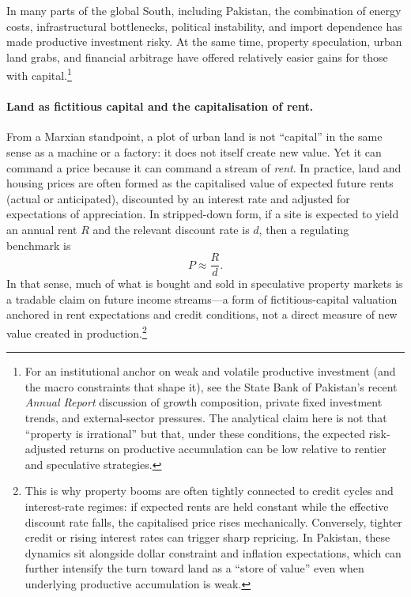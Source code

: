 In many parts of the global South, including Pakistan, the combination of
energy costs, infrastructural bottlenecks, political instability, and import
dependence has made productive investment risky. At the same time, property
speculation, urban land grabs, and financial arbitrage have offered
relatively easier gains for those with capital.\cite{StrugglePK_TDR}\footnote{For an institutional anchor on weak and volatile productive investment (and the macro constraints that shape it), see the State Bank of Pakistan's recent \emph{Annual Report} discussion of growth composition, private fixed investment trends, and external-sector pressures.\cite{SBPAnnualReportFY24} The analytical claim here is not that ``property is irrational'' but that, under these conditions, the expected risk-adjusted returns on productive accumulation can be low relative to rentier and speculative strategies.}

\paragraph{Land as fictitious capital and the capitalisation of rent.}
From a Marxian standpoint, a plot of urban land is not ``capital'' in the same sense as a machine or a factory:
it does not itself create new value. Yet it can command a price because it can command a stream of
\emph{rent}. In practice, land and housing prices are often formed as the capitalised value of expected future
rents (actual or anticipated), discounted by an interest rate and adjusted for expectations of appreciation.
In stripped-down form, if a site is expected to yield an annual rent $R$ and the relevant discount rate is $d$,
then a regulating benchmark is
\[
  P \approx \frac{R}{d}.
\]
In that sense, much of what is bought and sold in speculative property markets is a tradable claim on future
income streams---a form of fictitious-capital valuation anchored in rent expectations and credit conditions,
not a direct measure of new value created in production.\footnote{This is why property booms are often tightly connected to credit cycles and interest-rate regimes: if expected rents are held constant while the effective discount rate falls, the capitalised price rises mechanically. Conversely, tighter credit or rising interest rates can trigger sharp repricing. In Pakistan, these dynamics sit alongside dollar constraint and inflation expectations, which can further intensify the turn toward land as a ``store of value'' even when underlying productive accumulation is weak.}


